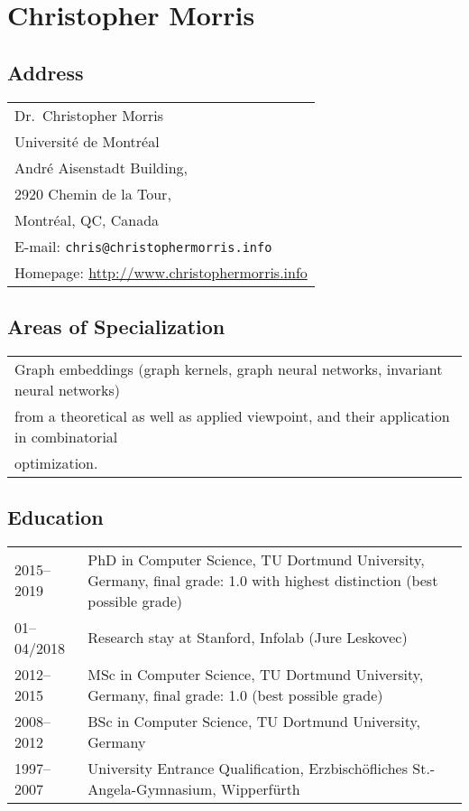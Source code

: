 \documentclass[11pt, a4paper]{scrartcl}
\begin{document}
\section*{\textcolor{upmaroon}{Christopher Morris}}
\vspace{-20pt}
\hrulefill
\subsection*{Address}
\noindent
\begin{tabular}{l}
Dr.~Christopher Morris\\
Université de Montréal\\ 
André Aisenstadt Building,\\ 
2920 Chemin de la Tour,\\
Montréal, QC, Canada\\
E-mail: \texttt{chris@christophermorris.info} \\
Homepage: \url{http://www.christophermorris.info} \\
\end{tabular}

\subsection*{Areas of Specialization}
\noindent
\begin{tabular}{p{15.5cm}}
Graph embeddings (graph kernels, graph neural networks, invariant neural networks) \\from a theoretical as well as applied viewpoint, and their application in combinatorial\\ optimization. \\
\end{tabular}

\subsection*{Education}
\noindent
\begin{tabular}{p{2.1cm}p{12.0cm}}
	2015--2019&PhD in Computer Science, TU Dortmund University, Germany, final grade: 1.0 with highest distinction  (best possible grade)\\
	01--04/2018& Research stay at Stanford, Infolab (Jure Leskovec)\\
	2012--2015&MSc in Computer Science, TU Dortmund University, Germany, final grade: 1.0 (best possible grade)\\
	2008--2012&BSc in Computer Science, TU Dortmund University, Germany\\
	1997--2007&University Entrance Qualification, Erzbisch\"ofliches St.-Angela-Gymnasium, Wipperf\"urth\\
\end{tabular}
\end{document}
